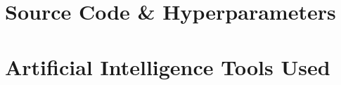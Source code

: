 \documentclass{templateDeusto}
\begin{document}
	\appendix 
	
	\chapter{Source Code \& Hyperparameters} 
	
	
	\chapter{Artificial Intelligence Tools Used}
	
	
	
	
\end{document}
